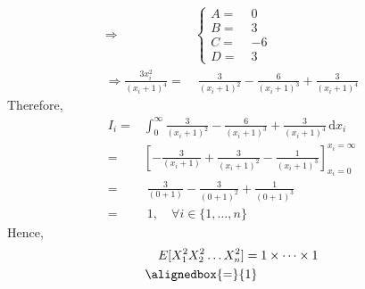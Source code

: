 \documentclass{mthe353answer}
\begin{document}
\begin{questions}
\begin{align*}
      \Rightarrow& \left\{
        \begin{aligned}
          A =&\; 0\\
          B =&\; 3\\
          C =&\; {-6}\\
          D =&\; 3
        \end{aligned}
      \right.\\
      \Rightarrow \frac{3x_i^2}{(x_i+1)^4} =&\; \frac{3}{(x_i+1)^2} - \frac{6}{(x_i+1)^3} + \frac{3}{(x_i+1)^4}
    \end{align*}
    Therefore,
    \begin{align*}
      I_i =& \int_{0}^{\infty} \frac{3}{(x_i+1)^2} - \frac{6}{(x_i+1)^3} + \frac{3}{(x_i+1)^4} \, \mathrm{d}x_i\\
      =& \left[-\frac{3}{(x_i+1)} + \frac{3}{(x_i+1)^2} - \frac{1}{(x_i+1)^3}\right]_{x_i=0}^{x_i=\infty}\\
      =&\; \frac{3}{(0+1)} - \frac{3}{(0+1)^2} + \frac{1}{(0+1)^3}\\
      =&\; 1, \quad \forall i \in \{1, \dots, n\}
    \end{align*}
    Hence,
    \begin{align*}
      E[X_1^2X_2^2 \dots X_n^2] =&\; 1 \times \cdots \times 1\\
      \alignedbox{=}{1}
    \end{align*}
  \end{questions}
\end{document}
